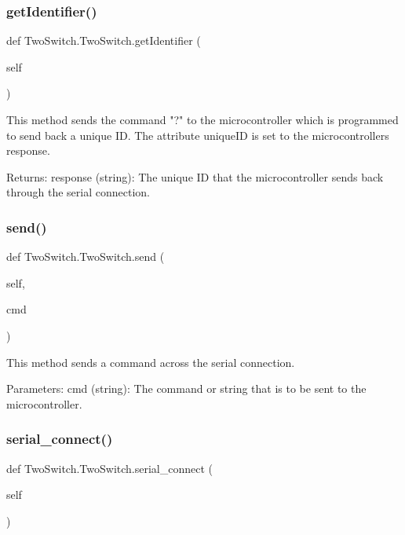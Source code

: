 \subsubsection{\texorpdfstring{getIdentifier()}{getIdentifier()}}
{\footnotesize\ttfamily def Two\+Switch.\+Two\+Switch.\+get\+Identifier (\begin{DoxyParamCaption}\item[{}]{self }\end{DoxyParamCaption})}

\begin{DoxyVerb}This method sends the command "?" to the microcontroller which is programmed to send back a unique ID. The attribute uniqueID is set to the microcontrollers response.

Returns:
    response (string): The unique ID that the microcontroller sends back through the serial connection.
\end{DoxyVerb}
 \mbox{\label{class_two_switch_1_1_two_switch_a00b015b6f700f4d524056ff1c9de7c72}} 
\subsubsection{\texorpdfstring{send()}{send()}}
{\footnotesize\ttfamily def Two\+Switch.\+Two\+Switch.\+send (\begin{DoxyParamCaption}\item[{}]{self,  }\item[{}]{cmd }\end{DoxyParamCaption})}

\begin{DoxyVerb}This method sends a command across the serial connection.

Parameters:
    cmd (string): The command or string that is to be sent to the microcontroller.
\end{DoxyVerb}
 \mbox{\label{class_two_switch_1_1_two_switch_ad816a09389ad0fb8ea56471aa4e8819f}} 
\subsubsection{\texorpdfstring{serial\_connect()}{serial\_connect()}}
{\footnotesize\ttfamily def Two\+Switch.\+Two\+Switch.\+serial\+\_\+connect (\begin{DoxyParamCaption}\item[{}]{self }\end{DoxyParamCaption})}

